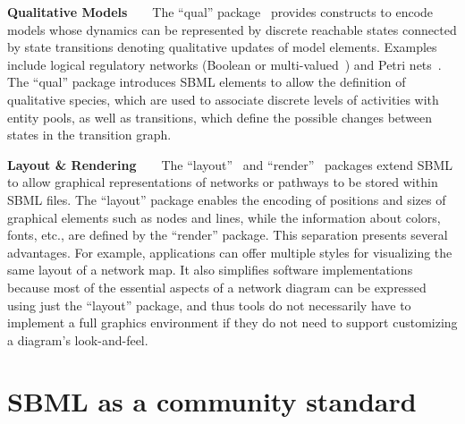 \documentclass[]{draft-sbml-paper}
\begin{document}
\textbf{Qualitative Models}~~~~The ``qual'' package~\citep{Chaouiya2015sbml} provides constructs to encode models whose dynamics can be represented by discrete reachable states connected by state transitions denoting qualitative updates of model elements. Examples include logical regulatory networks (Boolean or multi-valued~\citep{abou2016logical}) and Petri nets~\citep{chaouiya2007petri}. The ``qual'' package introduces SBML elements to allow the definition of qualitative species, which are used to associate discrete levels of activities with entity pools, as well as transitions, which define the possible changes between states in the transition graph.

\textbf{Layout \& Rendering}~~~~The ``layout''~\citep{Gauges2015} and ``render''~\citep{Bergmann2018sbml} packages extend SBML to allow graphical representations of networks or pathways to be stored within SBML files. The ``layout'' package enables the encoding of positions and sizes of graphical elements such as nodes and lines, while the information about colors, fonts, etc., are defined by the ``render'' package. This separation presents several advantages. For example, applications can offer multiple styles for visualizing the same layout of a network map. It also simplifies software implementations because most of the essential aspects of a network diagram can be expressed using just the ``layout'' package, and thus tools do not necessarily have to implement a full graphics environment if they do not need to support customizing a diagram's look-and-feel.

\hrulefill

\newpage
\section*{SBML as a community standard}

\end{document}
